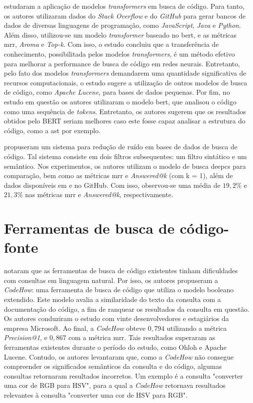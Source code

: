 \textcite{Salza2021OnTE} estudaram a aplicação de modelos \textit{transformers} em busca de código. Para tanto, os autores utilizaram dados do \textit{Stack Overflow} e do \textit{GitHub} para gerar bancos de dados de diversas linguagens de programação, como \textit{JavaScript}, \textit{Java} e \textit{Python}. Além disso, utilizou-se um modelo \textit{transformer} baseado no \gls{bert}, e as métricas \gls{mrr}, \textit{Aroma} e \textit{Top-k}. Com isso, o estudo concluiu que a transferência de conhecimento, possibilitada pelos modelos \textit{transformers}, é um método efetivo para melhorar a performance de busca de código em redes neurais. Entretanto, pelo fato dos modelos \textit{transformers} demandarem uma quantidade significativa de recursos computacionais, o estudo sugere a utilização de outros modelos de busca de código, como \textit{Apache Lucene}, para bases de dados pequenas. Por fim, no estudo em questão os autores utilizaram o modelo \gls{bert}, que analisou o código como uma sequência de \textit{tokens}. Entretanto, os autores sugerem que os resultados obtidos pelo BERT seriam melhores caso este fosse capaz analisar a estrutura do código, como a \gls{ast} por exemplo.

\textcite{Sun2022OnTI} propuseram um sistema para redução de ruído em bases de dados de busca de código. Tal sistema consiste em dois filtros subsequentes: um filtro sintático e um semântico. Nos experimentos, os autores utilizam o modelo de busca \gls{deepcs} para comparação, bem como as métricas \gls{mrr} e \textit{Answered@k} (com k = 1), além de dados disponíveis em \cite{Husain2019CodeSearchNetCE} e no GitHub. Com isso, observou-se uma média de $19,2\%$ e $21,3\%$ nas métricas \gls{mrr} e \textit{Answered@k}, respectivamente.

\section{Ferramentas de busca de código-fonte}
\label{chp:relatedWorks:sec:csTools}

\textcite{lv2015codehow} notaram que as ferramentas de busca de código existentes tinham dificuldades com consultas em linguagem natural. Por isso, os autores propuseram a \textit{CodeHow}: uma ferramenta de busca de código que utiliza o modelo booleano extendido. Este modelo avalia a similaridade do texto da consulta com a documentação do código, a fim de ranquear os resultados da consulta em questão. Os autores conduziram o estudo com vinte desenvolvedores e estagiários da empresa Microsoft. Ao final, a \textit{CodeHow} obteve $0,794$ utilizando a métrica \textit{Precision@1}, e $0,867$ com a métrica \gls{mrr}. Tais resultados superaram as ferramentas existentes durante o período do estudo, como Ohloh e Apache Lucene. Contudo, os autores levantaram que, como a \textit{CodeHow} não consegue compreender os significados semânticos da consulta e do código, algumas consultas retornaram resultados incorretos. Um exemplo é a consulta "converter uma cor de RGB para HSV", para a qual a \textit{CodeHow} retornava resultados relevantes à consulta "converter uma cor de HSV para RGB".

